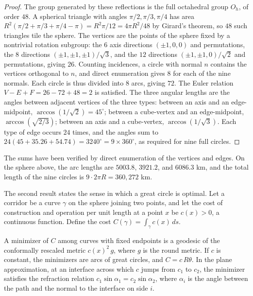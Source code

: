 \begin{proof}
The group generated by these reflections is the full octahedral group $O_h$, of order $48$. A spherical triangle with angles $\pi/2,\pi/3,\pi/4$ has area $R^2(\pi/2+\pi/3+\pi/4-\pi)=R^2\pi/12=4\pi R^2/48$ by Girard's theorem, so $48$ such triangles tile the sphere. The vertices are the points of the sphere fixed by a nontrivial rotation subgroup: the $6$ axis directions $(\pm1,0,0)$ and permutations, the $8$ directions $(\pm1,\pm1,\pm1)/\sqrt3$, and the $12$ directions $(\pm1,\pm1,0)/\sqrt2$ and permutations, giving $26$. Counting incidences, a circle with normal $n$ contains the vertices orthogonal to $n$, and direct enumeration gives $8$ for each of the nine normals. Each circle is thus divided into $8$ arcs, giving $72$. The Euler relation $V-E+F=26-72+48=2$ is satisfied. The three angular lengths are the angles between adjacent vertices of the three types: between an axis and an edge-midpoint, $\arccos(1/\sqrt2)=45^\circ$; between a cube-vertex and an edge-midpoint, $\arccos(\sqrt{2/3})$; between an axis and a cube-vertex, $\arccos(1/\sqrt3)$. Each type of edge occurs $24$ times, and the angles sum to $24(45+35.26+54.74)=3240^\circ=9\times360^\circ$, as required for nine full circles.
\end{proof}

The sums have been verified by direct enumeration of the vertices and edges. On the sphere above, the arc lengths are $5003.8$, $3921.2$, and $6086.3$ km, and the total length of the nine circles is $9\cdot2\pi R=360{,}272$ km.

The second result states the sense in which a great circle is optimal. Let a corridor be a curve $\gamma$ on the sphere joining two points, and let the cost of construction and operation per unit length at a point $x$ be $c(x)>0$, a continuous function. Define the cost $C(\gamma)=\int_\gamma c(x)\,ds$.

\begin{proposition}
A minimizer of $C$ among curves with fixed endpoints is a geodesic of the conformally rescaled metric $c(x)^2\,g$, where $g$ is the round metric. If $c$ is constant, the minimizers are arcs of great circles, and $C=c\,R\theta$. In the plane approximation, at an interface across which $c$ jumps from $c_1$ to $c_2$, the minimizer satisfies the refraction relation $c_1\sin\alpha_1=c_2\sin\alpha_2$, where $\alpha_i$ is the angle between the path and the normal to the interface on side $i$.
\end{proposition}

